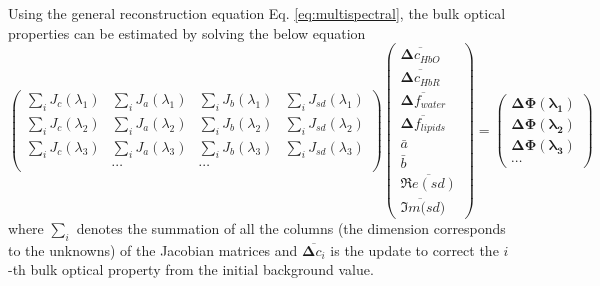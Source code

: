 \documentclass[12pt]{book}               %
\begin{document}
Using the general reconstruction equation Eq. \ref{eq:multispectral}, the bulk optical properties can be estimated by solving the below equation
\begin{equation}\label{eq:multispectralbulk}
\left(
\begin{array}{llll}
\sum_i{J}_{c}(\lambda_1) & \sum_i{J}_{a}(\lambda_1) & \sum_i{J}_b(\lambda_1) & \sum_i{J}_{sd}(\lambda_1)\\
\sum_i{J}_{c}(\lambda_2) & \sum_i{J}_{a}(\lambda_2) & \sum_i{J}_b(\lambda_2) & \sum_i{J}_{sd}(\lambda_2)\\
\sum_i{J}_{c}(\lambda_3) & \sum_i{J}_{a}(\lambda_3) & \sum_i{J}_b(\lambda_3) & \sum_i{J}_{sd}(\lambda_3)\\
 & \cdots & \cdots 
\end{array}\right)
\left(
\begin{array}{c}
\overline{\boldsymbol{\Delta}{c_{HbO}}}\\
\overline{\boldsymbol{\Delta}{c_{HbR}}}\\
\overline{\boldsymbol{\Delta}{f_{water}}}\\
\overline{\boldsymbol{\Delta}{f_{lipids}}}\\
\bar{a}\\
\bar{b}\\
\overline{\Re e({sd})}\\
\overline{\Im m({sd}})
\end{array}
\right)=\left(
\begin{array}{c}
\boldsymbol{\Delta\Phi(\lambda_1)}\\
\boldsymbol{\Delta\Phi(\lambda_2)}\\
\boldsymbol{\Delta\Phi(\lambda_3)}\\
\cdots
\end{array}\right)
\end{equation}
where $\sum_i$ denotes the summation of all the columns (the dimension corresponds to the unknowns) of the Jacobian matrices and $\overline{\boldsymbol{\Delta}{c_i}}$ is the update to correct the $i$-th bulk optical property from the initial background value.
\end{document}

